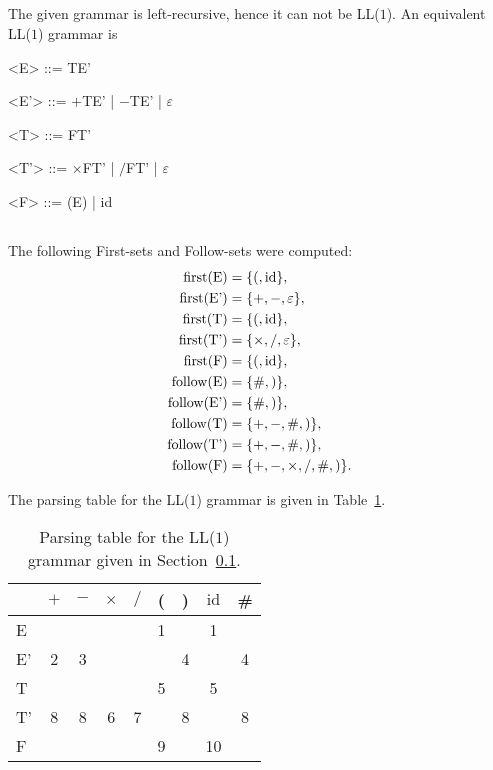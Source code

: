 \documentclass[11pt]{article}
\DeclareMathOperator{\first}{first}
\DeclareMathOperator{\follow}{follow}
\newcommand{\id}{\mathrm{id}}
\newcommand{\E}{\textnormal{E}}
\newcommand{\Ep}{\textnormal{E'}}
\newcommand{\T}{\textnormal{T}}
\newcommand{\Tp}{\textnormal{T'}}
\newcommand{\F}{\textnormal{F}}
\renewcommand{\epsilon}{\varepsilon}
\begin{document}
\subsection{}
\label{sec:2.1}
The given grammar is left-recursive, hence it can not be LL(\(1\)).
An equivalent LL(\(1\)) grammar is
\begin{grammar}
	<E> ::= TE'
	
	<E'> ::= \(+\)TE' | \(-\)TE' | \(\epsilon\)
	
	<T> ::= FT'
	
	<T'> ::= \(\times\)FT' | \(/\)FT' | \(\epsilon\)
	
	<F> ::= (E) | id
\end{grammar}

\subsection{}
The following First-sets and Follow-sets were computed:
\begin{align*}
\first(\E) &= \{(, \id\}, \\
\first(\Ep) &= \{+, -, \epsilon\}, \\
\first(\T) &= \{(, \id\}, \\
\first(\Tp) &= \{\times, /, \epsilon\}, \\
\first(\F) &= \{(, \id\}, \\
\follow(\E) &= \{\#, )\}, \\
\follow(\Ep) &= \{\#, )\}, \\
\follow(\T) &= \{+, -, \#, )\}, \\
\follow(\Tp) &= \{+, -, \#, )\}, \\
\follow(\F) &= \{+, -, \times, /, \#, )\}.
\end{align*}

The parsing table for the LL(\(1\)) grammar is given in Table~\ref{tab:parsing}.
\begin{table}[H]
	\centering
	\begin{tabular}{l|cccccccc}
		\toprule
		 & \(+\) & \(-\) & \(\times\) & \(/\) & ( & ) & \(\id\) & \# \\
		\midrule
		E & & & & & 1 & & 1 & \\
		E' & 2 & 3 & & & & 4 & & 4 \\
		T & & & & & 5 & & 5 & \\
		T' & 8 & 8 & 6 & 7 & & 8 & & 8 \\
		F & & & & & 9 & & 10 & \\
		\bottomrule
	\end{tabular}
	\caption{Parsing table for the LL(\(1\)) grammar given in Section~\ref{sec:2.1}.}
	\label{tab:parsing}
\end{table}
\end{document}
